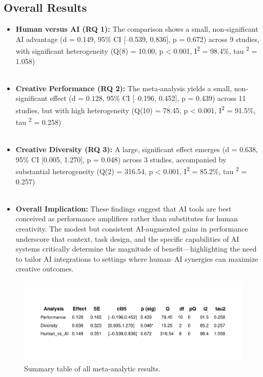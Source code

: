 \documentclass[acmsmall,authorversion]{acmart}
\begin{document}
\newpage


\subsection{Overall Results}
\label{sec:CreativePerformanceComparisonOfHumanAndAI}
\begin{itemize}
    \item \textbf{Human versus AI (RQ 1):} The comparison shows a small, non‐significant AI advantage (d = 0.149, 95\% CI [–0.539, 0.836], p = 0.672) across 9 studies, with significant heterogeneity (Q(8) = 10.00, p < 0.001, I\textsuperscript{2} = 98.4\%, tau \textsuperscript{2} = 1.058) 
  \\ \\
  \item \textbf{Creative Performance (RQ 2):} The meta‐analysis yields a small, non‐significant effect (d = 0.128, 95\% CI [–0.196, 0.452], p = 0.439) across 11 studies, but with high heterogeneity (Q(10) = 78.45, p < 0.001, I\textsuperscript{2} = 91.5\%, tau \textsuperscript{2} = 0.258)
  \\ \\
  \item \textbf{Creative Diversity (RQ 3):} A large, significant effect emerges (d = 0.638, 95\% CI [0.005, 1.270], p = 0.048) across 3 studies, accompanied by substantial heterogeneity (Q(2) = 316.54, p < 0.001, I\textsuperscript{2} = 85.2\%, tau \textsuperscript{2} = 0.257)
  \\ \\
  
  \item \textbf{Overall Implication:} These findings suggest that AI tools are best conceived as performance amplifiers rather than substitutes for human creativity. The modest but consistent AI‐augmented gains in performance underscore that context, task design, and the specific capabilities of AI systems critically determine the magnitude of benefit—highlighting the need to tailor AI integrations to settings where human–AI synergies can maximize creative outcomes. 
\end{itemize}

\begin{figure}[H]
  \centering
  \includegraphics[width=\linewidth]{table_all_meta_analyses_results}
  \caption{Summary table of all meta‐analytic results.}
\end{figure}
\newpage
\end{document}
